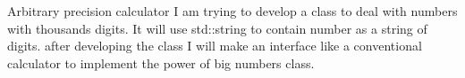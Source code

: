 Arbitrary precision calculator I am trying to develop a class to deal with numbers with thousands digits. It will use std\+::string to contain number as a string of digits. after developing the class I will make an interface like a conventional calculator to implement the power of big numbers class. 
